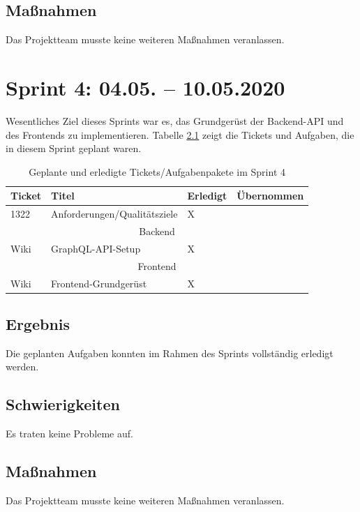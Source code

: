 \documentclass[a4paper,11pt,listof=numbered,glossary=totoc,parskip=half,toc=bib]{scrreprt}
\begin{document}
    \section{Maßnahmen}
    Das Projektteam musste keine weiteren Maßnahmen veranlassen.
    
    \chapter{Sprint 4: 04.05. – 10.05.2020}

Wesentliches Ziel dieses Sprints war es, das Grundgerüst der Backend-API und des Frontends zu implementieren. Tabelle \ref{tab:sprint4} zeigt die Tickets und Aufgaben, die in diesem Sprint geplant waren.

\begin{table}    
    \begin{tabularx}{\textwidth}{lXll}
			\toprule
			\textbf{Ticket} & \textbf{Titel} & \textbf{Erledigt} & \textbf{Übernommen} \\
			\midrule
			1322	&	Anforderungen/Qualitätsziele	&	X	&		\\
					\midrule
		\multicolumn{4}{c}{Backend}\\
		\midrule
Wiki	&	GraphQL-API-Setup	&	X	&		\\
		\midrule
		\multicolumn{4}{c}{Frontend}\\
		\midrule
Wiki	&	Frontend-Grundgerüst	&	X	&		\\
			\bottomrule
		\end{tabularx}
\caption{Geplante und erledigte Tickets/Aufgabenpakete im Sprint 4}
\label{tab:sprint4}
\end{table} 
    
    \section{Ergebnis}
    Die geplanten Aufgaben konnten im Rahmen des Sprints vollständig erledigt werden.
    
    \section{Schwierigkeiten}
    Es traten keine Probleme auf. 
    
    \section{Maßnahmen}
    Das Projektteam musste keine weiteren Maßnahmen veranlassen.
    
\end{document}

